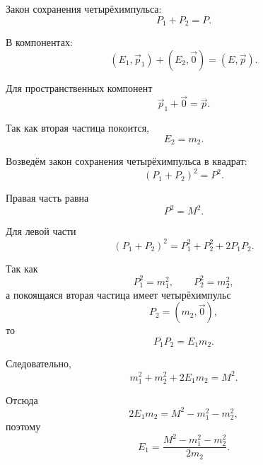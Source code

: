 \documentclass[../final.tex]{subfiles}
\begin{document}
Закон сохранения четырёхимпульса:
%
\begin{equation*}
    P_1+P_2=P.
\end{equation*}

В компонентах:
%
\begin{equation*}
    (E_1,\vec p_1)
    +
    (E_2,\vec 0)
    =
    (E,\vec p).
\end{equation*}

Для пространственных компонент
%
\begin{equation*}
    \vec p_1+\vec 0
    =
    \vec p.
\end{equation*}

Так как вторая частица покоится,
%
\begin{equation*}
    E_2=m_2.
\end{equation*}

Возведём закон сохранения четырёхимпульса в квадрат:
%
\begin{equation*}
    (P_1+P_2)^2
    =
    P^2.
\end{equation*}

Правая часть равна
%
\begin{equation*}
    P^2=M^2.
\end{equation*}

Для левой части
%
\begin{equation*}
    (P_1+P_2)^2
    =
    P_1^2+P_2^2+2P_1P_2.
\end{equation*}

Так как
%
\begin{equation*}
    P_1^2=m_1^2,
    \qquad
    P_2^2=m_2^2,
\end{equation*}
%
а покоящаяся вторая частица имеет четырёхимпульс
%
\begin{equation*}
    P_2=(m_2,\vec 0),
\end{equation*}
%
то
%
\begin{equation*}
    P_1P_2
    =
    E_1m_2.
\end{equation*}

Следовательно,
%
\begin{equation*}
    m_1^2+m_2^2+2E_1m_2
    =
    M^2.
\end{equation*}

Отсюда
%
\begin{equation*}
    2E_1m_2
    =
    M^2-m_1^2-m_2^2,
\end{equation*}
%
поэтому
%
\begin{equation*}
    E_1
    =
    \frac{
        M^2-m_1^2-m_2^2
    }{
        2m_2
    }.
\end{equation*}
\end{document}
